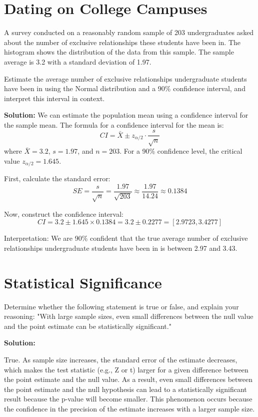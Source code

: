 \documentclass[12pt]{article}
\begin{document}
\section{Dating on College Campuses}

 A survey conducted on a reasonably random sample of 203 undergraduates asked about the number of exclusive relationships these students have been in. The histogram shows the distribution of the data from this sample. The sample average is 3.2 with a standard deviation of 1.97.

Estimate the average number of exclusive relationships undergraduate students have been in using the Normal distribution and a 90\% confidence interval, and interpret this interval in context.

\textbf{Solution:}
We can estimate the population mean using a confidence interval for the sample mean. The formula for a confidence interval for the mean is:
\[
CI = \bar{X} \pm z_{\alpha/2} \cdot \frac{s}{\sqrt{n}}
\]
where \( \bar{X} = 3.2 \), \( s = 1.97 \), and \( n = 203 \). For a 90\% confidence level, the critical value \( z_{\alpha/2} = 1.645 \).

First, calculate the standard error:
\[
SE = \frac{s}{\sqrt{n}} = \frac{1.97}{\sqrt{203}} \approx \frac{1.97}{14.24} \approx 0.1384
\]

Now, construct the confidence interval:
\[
CI = 3.2 \pm 1.645 \times 0.1384 = 3.2 \pm 0.2277 = [2.9723, 3.4277]
\]

Interpretation: We are 90\% confident that the true average number of exclusive relationships undergraduate students have been in is between 2.97 and 3.43.

\section{Statistical Significance}

Determine whether the following statement is true or false, and explain your reasoning: "With large sample sizes, even small differences between the null value and the point estimate can be statistically significant."

\textbf{Solution:}

{True.} As sample size increases, the standard error of the estimate decreases, which makes the test statistic (e.g., Z or t) larger for a given difference between the point estimate and the null value. As a result, even small differences between the point estimate and the null hypothesis can lead to a statistically significant result because the p-value will become smaller. This phenomenon occurs because the confidence in the precision of the estimate increases with a larger sample size.
\end{document}

